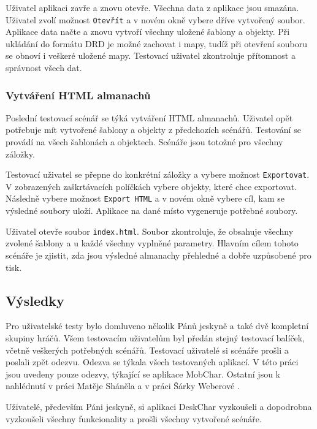 \documentclass[thesis=B,czech]{resources/FITthesis}[2012/06/26]
\begin{document}
Uživatel aplikaci zavře a znovu otevře. Všechna data z aplikace jsou smazána. Uživatel zvolí možnost \texttt{Otevřít} a v novém okně vybere dříve vytvořený soubor. Aplikace data načte a znovu vytvoří všechny uložené šablony a objekty. Při ukládání do formátu DRD je možné zachovat i mapy, tudíž při otevření souboru se obnoví i veškeré uložené mapy. Testovací uživatel zkontroluje přítomnost a správnost všech dat. 

\subsubsection{Vytváření HTML almanachů}
Poslední testovací scénář se týká vytváření HTML almanachů. Uživatel opět potřebuje mít vytvořené šablony a objekty z předchozích scénářů. Testování se provádí na všech šablonách a objektech. Scénáře jsou totožné pro všechny záložky. \par

Testovací uživatel se přepne do konkrétní záložky a vybere možnost \texttt{Exportovat}. V zobrazených zaškrtávacích políčkách vybere objekty, které chce exportovat. Následně vybere možnost \texttt{Export HTML} a v novém okně vybere cíl, kam se výsledné soubory uloží. Aplikace na dané místo vygeneruje potřebné soubory. \par

Uživatel otevře soubor \texttt{index.html}. Soubor zkontroluje, že obsahuje všechny zvolené šablony a u každé všechny vyplněné parametry. Hlavním cílem tohoto scénáře je zjistit, zda jsou výsledné almanachy přehledné a dobře uzpůsobené pro tisk.

\subsection{Výsledky}
Pro uživatelské testy bylo domluveno několik Pánů jeskyně a také dvě kompletní skupiny hráčů. Všem testovacím uživatelům byl předán stejný testovací balíček, včetně veškerých potřebných scénářů. Testovací uživatelé si scénáře prošli a poslali zpět odezvu. Odezva se týkala všech testovaných aplikací. V této práci jsou uvedeny pouze odezvy, týkající se aplikace MobChar. Ostatní jsou k nahlédnutí v práci Matěje Sháněla\cite{Shanel_2017} a v práci Šárky Weberové \cite{Weberova_2017}. \par

Uživatelé, především Páni jeskyně, si aplikaci DeskChar vyzkoušeli a dopodrobna vyzkoušeli všechny funkcionality a prošli všechny vytvořené scénáře. \par
\end{document}
